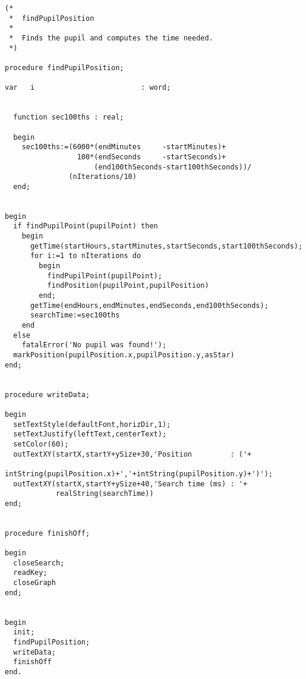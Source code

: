 \begin{verbatim}
(*
 *  findPupilPosition
 *
 *  Finds the pupil and computes the time needed.
 *)

procedure findPupilPosition;

var   i                         : word;


  function sec100ths : real;

  begin
    sec100ths:=(6000*(endMinutes     -startMinutes)+
                 100*(endSeconds     -startSeconds)+
                     (end100thSeconds-start100thSeconds))/
               (nIterations/10)
  end;


begin
  if findPupilPoint(pupilPoint) then
    begin
      getTime(startHours,startMinutes,startSeconds,start100thSeconds);
      for i:=1 to nIterations do
        begin
          findPupilPoint(pupilPoint);
          findPosition(pupilPoint,pupilPosition)
        end;
      getTime(endHours,endMinutes,endSeconds,end100thSeconds);
      searchTime:=sec100ths
    end
  else
    fatalError('No pupil was found!');
  markPosition(pupilPosition.x,pupilPosition.y,asStar)
end;


procedure writeData;

begin
  setTextStyle(defaultFont,horizDir,1);
  setTextJustify(leftText,centerText);
  setColor(60);
  outTextXY(startX,startY+ySize+30,'Position         : ('+
            intString(pupilPosition.x)+','+intString(pupilPosition.y)+')');
  outTextXY(startX,startY+ySize+40,'Search time (ms) : '+
            realString(searchTime))
end;


procedure finishOff;

begin
  closeSearch;
  readKey;
  closeGraph
end;


begin
  init;
  findPupilPosition;
  writeData;
  finishOff
end.
\end{verbatim}
